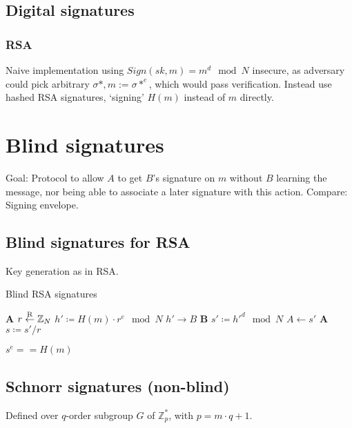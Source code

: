 \subsection{Digital signatures}

\subsubsection{RSA}

Naive implementation using $Sign(sk, m) = m^d \mod N$ insecure, as adversary
could pick arbitrary $\sigma*, m := \sigma*^e$, which would pass verification.
Instead use hashed RSA signatures, `signing' $H(m)$ instead of $m$ directly.

\section{Blind signatures}

Goal: Protocol to allow $A$ to get $B$'s signature on $m$ without $B$ learning
the message, nor being able to associate a later signature with this action.
Compare: Signing envelope.

\subsection{Blind signatures for RSA}

Key generation as in RSA.

\begin{algorithm}
		\caption{Blind RSA signatures}
		\begin{algorithmic}[0]
				\State \textbf{A}
				\State $r \overset{\mathrm{R}}{\gets} \mathbb{Z}_N$
				\State $h' \coloneqq H(m) \cdot r^e \mod N$
				\State $h' \rightarrow B$
				\State \textbf{B}
				\State $s' \coloneqq h'^d \mod N$
				\State $A \leftarrow s'$
				\State \textbf{A}
				\State $s \coloneqq s' / r$
				\EndProcedure

				\State $s^e == H(m)$
				\EndProcedure
		\end{algorithmic}
\end{algorithm}

\subsection{Schnorr signatures (non-blind)}

Defined over $q$-order subgroup $G$ of $\mathbb{Z}^*_p$, with $p = m \cdot q +
1$.

